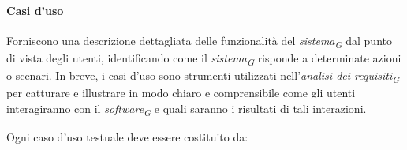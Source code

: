 \paragraph{Casi d'uso}
Forniscono una descrizione dettagliata delle funzionalità del \textit{sistema}\textsubscript{\textit{G}} dal punto di vista degli utenti, identificando come il \textit{sistema}\textsubscript{\textit{G}} risponde a determinate azioni o scenari. In breve, i casi d'uso sono strumenti utilizzati nell'\textit{analisi dei requisiti}\textsubscript{\textit{G}} per catturare e illustrare in modo chiaro e comprensibile come gli utenti interagiranno con il \textit{software}\textsubscript{\textit{G}} e quali saranno i risultati di tali interazioni. 

\vspace{0.2cm}

Ogni caso d'uso testuale deve essere costituito da:
